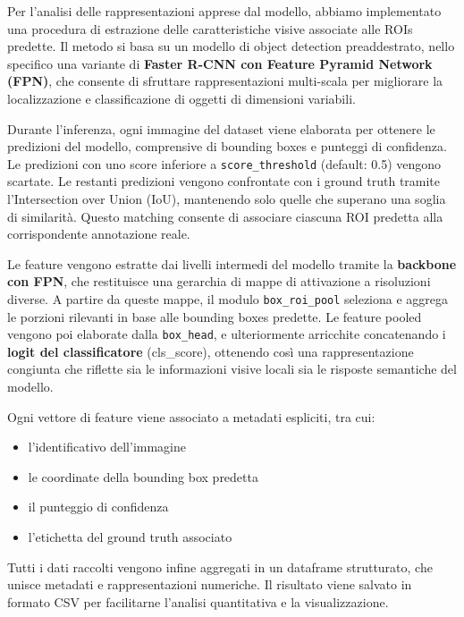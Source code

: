 \documentclass[minted, draw]{../tex/hebdomon}
\begin{document}
Per l'analisi delle rappresentazioni apprese dal modello, abbiamo implementato una procedura di estrazione delle caratteristiche visive associate alle ROIs predette. Il metodo si basa su un modello di object detection preaddestrato, nello specifico una variante di \textbf{Faster R-CNN con Feature Pyramid Network (FPN)}, che consente di sfruttare rappresentazioni multi-scala per migliorare la localizzazione e classificazione di oggetti di dimensioni variabili.

Durante l'inferenza, ogni immagine del dataset viene elaborata per ottenere le predizioni del modello, comprensive di bounding boxes e punteggi di confidenza. Le predizioni con uno score inferiore a \texttt{score\_threshold} (default: 0.5) vengono scartate. Le restanti predizioni vengono confrontate con i ground truth tramite l'Intersection over Union (IoU), mantenendo solo quelle che superano una soglia di similarità. Questo matching consente di associare ciascuna ROI predetta alla corrispondente annotazione reale.

Le feature vengono estratte dai livelli intermedi del modello tramite la \textbf{backbone con FPN}, che restituisce una gerarchia di mappe di attivazione a risoluzioni diverse. A partire da queste mappe, il modulo \texttt{box\_roi\_pool} seleziona e aggrega le porzioni rilevanti in base alle bounding boxes predette. Le feature pooled vengono poi elaborate dalla \texttt{box\_head}, e ulteriormente arricchite concatenando i \textbf{logit del classificatore} (cls\_score), ottenendo così una rappresentazione congiunta che riflette sia le informazioni visive locali sia le risposte semantiche del modello.


Ogni vettore di feature viene associato a metadati espliciti, tra cui:
\begin{itemize}
	\item l'identificativo dell'immagine
	\item le coordinate della bounding box predetta
	\item il punteggio di confidenza
	\item l’etichetta del ground truth associato
\end{itemize}
 

Tutti i dati raccolti vengono infine aggregati in un dataframe strutturato, che unisce metadati e rappresentazioni numeriche. Il risultato viene salvato in formato CSV per facilitarne l’analisi quantitativa e la visualizzazione.


\end{document}
